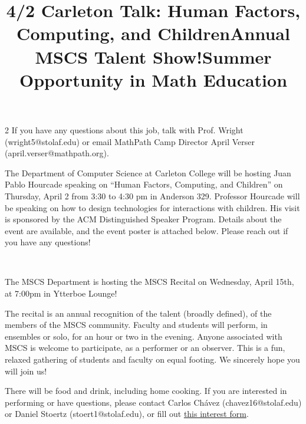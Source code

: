 \documentclass[12pt]{article}
\newcommand{\bolder}{\textbf}
\begin{document}
\begin{multicols}{2}
If you have any questions about this job, talk with Prof. Wright (wright5@stolaf.edu) or email MathPath Camp Director April Verser (april.verser@mathpath.org).


 \begin{tcolorbox}[colback=white, colframe=black]
    \begin{center}
    \title{{\large \bolder{4/2 Carleton Talk: Human Factors, Computing, and Children}}}
    \end{center}
\end{tcolorbox}
The Department of Computer Science at Carleton College will be hosting Juan Pablo Hourcade speaking on “Human Factors, Computing, and Children” on Thursday, April 2 from 3:30 to 4:30 pm in Anderson 329. Professor Hourcade will be speaking on how to design technologies for interactions with children.  His visit is sponsored by the ACM Distinguished Speaker Program. Details about the event are available, and the event poster is attached below. Please reach out if you have any questions! 

\vfill\,

 \begin{tcolorbox}[colback=white, colframe=black]
    \begin{center}
    \title{{\large \bolder{Annual MSCS Talent Show!}}}
    \end{center}
\end{tcolorbox}
The MSCS Department is hosting the MSCS Recital on Wednesday, April 15th, at 7:00pm in Ytterboe Lounge!

The recital is an annual recognition of the talent (broadly defined), of the members of the MSCS community. Faculty and students will perform, in ensembles or solo, for an hour or two in the evening. Anyone associated with MSCS is welcome to participate, as a performer or an observer. This is a fun, relaxed gathering of students and faculty on equal footing. We sincerely hope you will join us!

There will be food and drink, including home cooking. If you are interested in performing or have questions, please contact Carlos Chávez (chavez16@stolaf.edu) or Daniel Stoertz (stoert1@stolaf.edu), or fill out \href{https://docs.google.com/forms/d/e/1FAIpQLSctO8sAXxTCjrrDK_F1ocOHFMjC1OTzejShYgvfoWYQjHmg1g/viewform?usp=publish-editor}{this interest form}.
 

\begin{tcolorbox}[colback=white, colframe=black]
    \begin{center}
    \title{{\large \bolder{Summer Opportunity in Math Education}}}
    \end{center}
\end{tcolorbox}


\end{multicols}
\end{document}
